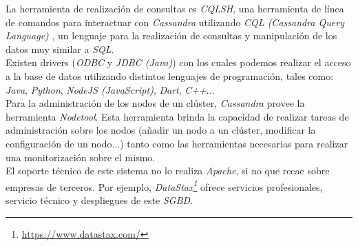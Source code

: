 \documentclass[11pt,a4paper]{article}
\begin{document}
La herramienta de realización de consultas es \emph{CQLSH}, una herramienta de línea de comandos para interactuar con \emph{Cassandra} utilizando \emph{CQL (Cassandra Query Language)} \cite{AP:3}, un lenguaje para la realización de consultas y manipulación de los datos muy similar a \emph{SQL}. \cite{WIKI:5} \\
Existen drivers (\emph{ODBC} y \emph{JDBC (Java)}) con los cuales podemos realizar el acceso a la base de datos utilizando distintos lenguajes de programación, tales como: \emph{Java}, \emph{Python}, \emph{NodeJS (JavaScript)}, \emph{Dart}, \emph{C++}... \cite{AP:4} \\
Para la administración de los nodos de un clúster, \emph{Cassandra} provee la herramienta \emph{Nodetool}. Esta herramienta brinda la capacidad de realizar tareas de administración sobre los nodos (añadir un nodo a un clúster, modificar la configuración de un nodo...) tanto como las herramientas necesarias para realizar una monitorización sobre el mismo. \cite{WIKI:5} \\

El soporte técnico de este sistema no lo realiza \emph{Apache}, si no que recae sobre empresas de terceros. Por ejemplo, \emph{DataStax\footnote{\url{https://www.datastax.com/}}} ofrece servicios profesionales, servicio técnico y despliegues de este \emph{SGBD}. \cite{APW:1}\\


\newpage



\end{document}
